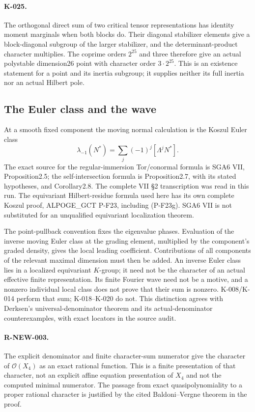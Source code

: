 \paragraph{K-025.}
The orthogonal direct sum of two critical tensor representations
has identity moment marginals when both blocks do. Their diagonal
stabilizer elements give a block-diagonal subgroup of the larger
stabilizer, and the determinant-product character multiplies.
The coprime orders $2^{25}$ and three therefore give an actual
polystable dimension26 point with character order $3\cdot2^{25}$.
This is an existence statement for a point and its inertia subgroup;
it supplies neither its full inertia nor an actual Hilbert pole.

\subsection{The Euler class and the wave}
At a smooth fixed component the moving normal calculation is
the Koszul Euler class
\[
        \lambda_{-1}(N^*)=\sum_j(-1)^j[\Lambda^jN^*].
\]
The exact source for the regular-immersion Tor/conormal formula
is SGA6 VII, Proposition2.5; the self-intersection formula is
Proposition2.7, with its stated hypotheses, and Corollary2.8.
The complete VII \S2 transcription was read in this run.
The equivariant Hilbert-residue formula used here has its own
complete Koszul proof, ALPOGE\_GCT P-F23, including (P-F23g).
SGA6 VII is not substituted for an unqualified equivariant
localization theorem.

The point-pullback convention fixes the eigenvalue phases.
Evaluation of the inverse moving Euler class at the grading
element, multiplied by the component's graded density, gives
the local leading coefficient.  Contributions of all components
of the relevant maximal dimension must then be added.
An inverse Euler class lies in a localized equivariant $K$-group;
it need not be the character of an actual effective finite
representation.  Its finite Fourier wave need not be a motive,
and a nonzero individual local class does not prove that their
sum is nonzero.  K-008/K-014 perform that sum; K-018--K-020 do not.
This distinction agrees with Derksen's universal-denominator
theorem and its actual-denominator counterexamples, with exact
locators in the source audit.

\paragraph{R-NEW-003.}
The explicit denominator and finite character-sum numerator
give the character of $\mathcal O(X_4)$ as an exact rational
function.  This is a finite presentation of that character,
not an explicit affine equation presentation of $X_4$ and not
the computed minimal numerator.  The passage from exact
quasipolynomiality to a proper rational character is justified
by the cited Baldoni--Vergne theorem in the proof.

